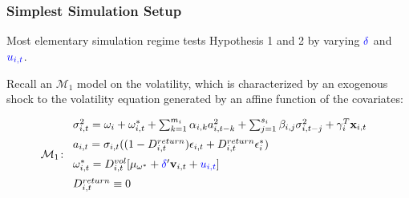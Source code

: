 \documentclass[9pt]{beamer}
\newcommand{\x}{\textbf{x}}
\def\mc#1{\mathcal{#1}} %
\def\mc#1{\mathcal{#1}}
\theoremstyle{definition}
\begin{document}
\begin{frame}
\fontsize{8pt}{9pt}

\frametitle{Simplest Simulation Setup}

Most elementary simulation regime tests Hypothesis 1 and 2 by varying $\textcolor{blue}{\delta}$ and $\textcolor{blue}{u_{i,t}}$.\\

\bigbreak

Recall an \hyperlink{model_1}{$\mc{M}_1$} model on the volatility, which is characterized by an exogenous shock to the volatility equation generated by an affine function of the covariates:

  \begin{align*}
    \mc{M}_1 \colon \begin{array}{l}
       \sigma^{2}_{i,t} = \omega_{i} + \omega^{*}_{i,t} + \sum^{m_{i}}_{k=1}\alpha_{i,k}a^{2}_{i,t-k} + \sum_{j=1}^{s_{i}}\beta_{i,j}\sigma_{i,t-j}^{2} + \gamma_{i}^{T} \x_{i,t} \text{ }\\[.2cm]
       a_{i,t} = \sigma_{i,t}((1-D^{return}_{i,t})\epsilon_{i,t} + D^{return}_{i,t}\epsilon^{*}_{i})\\[.2cm]
      \omega_{i,t}^{*} = D^{vol}_{i,t}[\mu_{\omega^{*}}+\textcolor{blue}{\delta}'\textbf{v}_{i, t}+ \textcolor{blue}{u_{i,t}}]\\[.2cm]
      D^{return}_{i,t} \equiv 0
    \end{array}
    \end{align*}

\end{frame}

    


\end{document}
